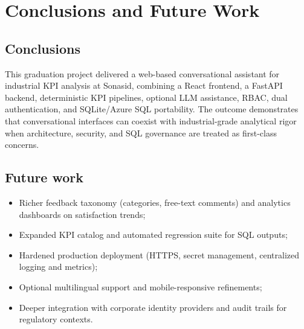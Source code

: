\chapter{Conclusions and Future Work}

\section{Conclusions}
This graduation project delivered a web-based conversational assistant for industrial KPI analysis at Sonasid, combining a React frontend, a FastAPI backend, deterministic KPI pipelines, optional LLM assistance, RBAC, dual authentication, and SQLite/Azure SQL portability. The outcome demonstrates that conversational interfaces can coexist with industrial-grade analytical rigor when architecture, security, and SQL governance are treated as first-class concerns.

\section{Future work}
\begin{itemize}[leftmargin=*]
  \item Richer feedback taxonomy (categories, free-text comments) and analytics dashboards on satisfaction trends;
  \item Expanded KPI catalog and automated regression suite for SQL outputs;
  \item Hardened production deployment (HTTPS, secret management, centralized logging and metrics);
  \item Optional multilingual support and mobile-responsive refinements;
  \item Deeper integration with corporate identity providers and audit trails for regulatory contexts.
\end{itemize}
